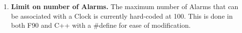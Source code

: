 
\begin{enumerate}

\item {\bf Limit on number of Alarms.}  The maximum number of Alarms that 
can be associated with a Clock is currently hard-coded at 100.  This is done
in both F90 and C++ with a \#define for ease of modification.

\end{enumerate}
